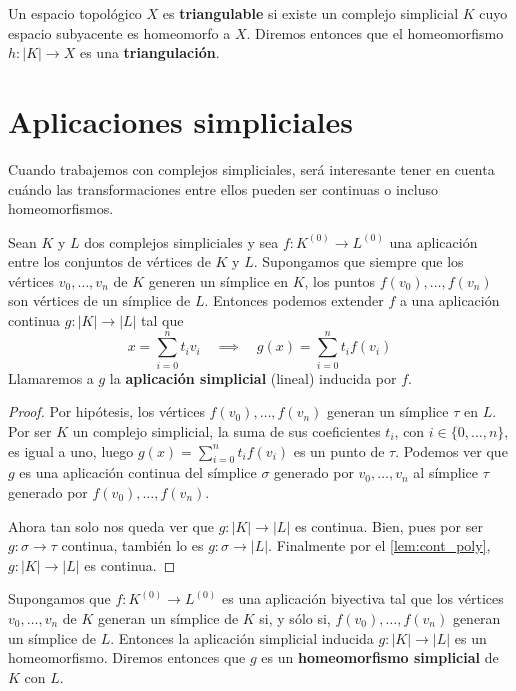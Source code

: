 \begin{definicion}
	Un espacio topológico $X$ es \textbf{triangulable} si existe un complejo simplicial $K$ cuyo espacio subyacente es homeomorfo a $X$. Diremos entonces que el homeomorfismo $h: |K| \rightarrow X$ es una \textbf{triangulación}.
\end{definicion}

\section{Aplicaciones simpliciales}

Cuando trabajemos con complejos simpliciales, será interesante tener en cuenta cuándo las 
transformaciones entre ellos pueden ser continuas o incluso homeomorfismos. 

\begin{lema}
	Sean $K$ y $L$ dos complejos simpliciales y sea $f: K^{(0)} \rightarrow L^{(0)}$ una aplicación entre los conjuntos de vértices de $K$ y $L$. 
	Supongamos que siempre que los vértices $v_0, \dots, v_n$ de $K$ generen un símplice en $K$, 
	los puntos $f(v_0), \dots, f(v_n)$ son vértices de un símplice de $L$. Entonces podemos extender $f$ 
	a una aplicación continua $g:|K| \rightarrow |L|$ tal que
	\[ x = \sum_{i=0}^{n}t_iv_i \quad \implies \quad g(x) = \sum_{i=0}^{n}t_if(v_i) \]
	Llamaremos a $g$ la \textbf{aplicación simplicial} (lineal) inducida por $f$.
\end{lema}

\begin{proof}
	Por hipótesis, los vértices $f(v_0), \dots, f(v_n)$ generan un símplice $\tau$ en $L$. Por 
	ser $K$ un complejo simplicial, la suma de sus coeficientes $t_i$, con $i \in \{0, \dots, n\}$,  
	es igual a uno, luego $g(x) = \sum_{i=0}^{n}t_if(v_i)$ es un punto de $\tau$. Podemos ver que 
	$g$ es una aplicación continua del símplice $\sigma$ generado por $v_0, \dots, v_n$ al símplice 
	$\tau$ generado por $f(v_0), \dots, f(v_n)$.
	
	Ahora tan solo nos queda ver que $g:|K| \rightarrow |L|$ es continua. Bien, pues por ser 
	$g: \sigma \rightarrow \tau$ continua, también lo es $g: \sigma \rightarrow |L|$. Finalmente 
	por el \autoref{lem:cont_poly}, $g:|K| \rightarrow |L|$ es continua.
\end{proof}

\begin{lema}\label{lem:homeo_complex}
	Supongamos que $f:K^{(0)} \rightarrow L^{(0)}$ es una aplicación biyectiva tal que los vértices 
	$v_0, \dots, v_n$ de $K$ generan un símplice de $K$ si, y sólo si, $f(v_0), \dots, f(v_n)$ 
	generan un símplice de $L$. Entonces la aplicación simplicial inducida $g:|K| \rightarrow |L|$ 
	es un homeomorfismo. Diremos entonces que $g$ es un \textbf{homeomorfismo simplicial} de $K$ con $L$.
\end{lema}

